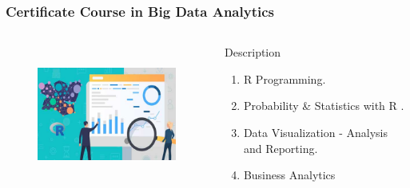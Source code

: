 \begin{frame}
	\frametitle{Certificate Course in Big Data Analytics}
		\begin{columns}
		
		
		\begin{figure}
			\includegraphics[width=170pt,height=130pt]{figures/course_bda.jpg}
		\end{figure}
		
		
		\begin{block}{Description}
			
			\begin{enumerate}
				\item R Programming.
				\item Probability \& Statistics with R . 
				\item Data Visualization - Analysis and Reporting.
				\item Business Analytics
			\end{enumerate}
			
		\end{block}
		
	\end{columns}
\end{frame}